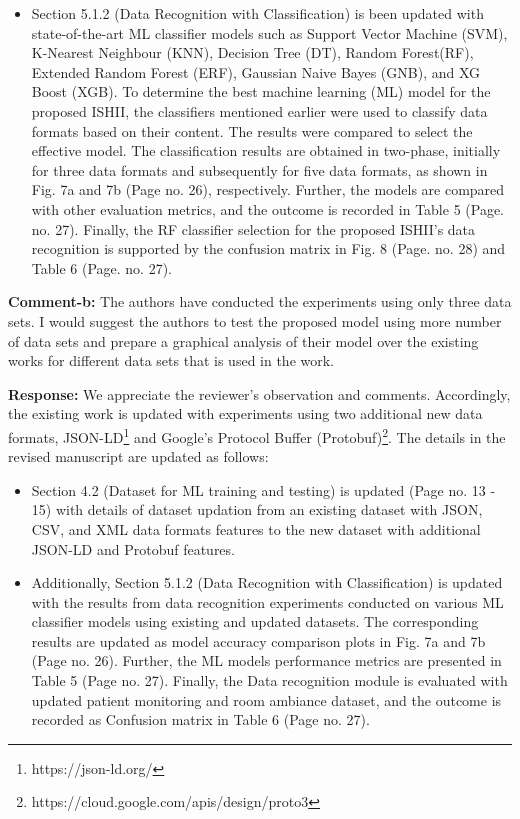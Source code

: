 \documentclass[a4paper,10pt]{article}
\begin{document}
\begin{enumerate}
\begin{itemize}
    \item Section 5.1.2 (Data Recognition with Classification) is been updated with state-of-the-art ML classifier models such as Support Vector Machine (SVM), K-Nearest Neighbour (KNN), Decision Tree (DT), Random Forest(RF), Extended Random Forest (ERF), Gaussian Naive Bayes (GNB), and XG Boost (XGB). To determine the best machine learning (ML) model for the proposed ISHII, the classifiers mentioned earlier were used to classify data formats based on their content. The results were compared to select the effective model. The classification results are obtained in two-phase, initially for three data formats and subsequently for five data formats, as shown in Fig. 7a and 7b (Page no. 26), respectively. Further, the models are compared with other evaluation metrics, and the outcome is recorded in Table 5 (Page. no. 27). Finally, the RF classifier selection for the proposed ISHII's data recognition is supported by the confusion matrix in Fig. 8 (Page. no. 28) and Table 6 (Page. no. 27).
\end{itemize}

{\color{blue} \item \textbf{Comment-b:} The authors have conducted the experiments using only three data sets. I would suggest the authors to test the proposed model using more number of data sets and prepare a graphical analysis of their model over the existing works for different data sets that is used in the work.} 
 
\textbf{Response:} We appreciate the reviewer's observation and comments. Accordingly, the existing work is updated with experiments using two additional new data formats, JSON-LD\footnote{https://json-ld.org/} and Google's Protocol Buffer (Protobuf)\footnote{https://cloud.google.com/apis/design/proto3}. The details in the revised manuscript are updated as follows:
\begin{itemize}
      \item Section 4.2 (Dataset for ML training and testing) is updated (Page no. 13 - 15) with details of dataset updation from an existing dataset with JSON, CSV, and XML data formats features to the new dataset with additional JSON-LD and Protobuf features. 
      \item Additionally, Section 5.1.2 (Data Recognition with Classification) is updated with the results from data recognition experiments conducted on various ML classifier models using existing and updated datasets. The corresponding results are updated as model accuracy comparison plots in Fig. 7a and 7b (Page no. 26). Further, the ML models performance metrics are presented in Table 5 (Page no. 27). Finally, the Data recognition module is evaluated with updated patient monitoring and room ambiance dataset, and the outcome is recorded as Confusion matrix in Table 6 (Page no. 27).  
\end{itemize}


\end{enumerate}
\end{document}
